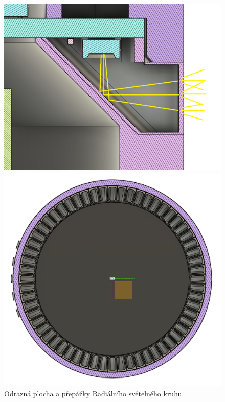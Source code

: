 \begin{figure}[h!]
    \begin{minipage}{0.5\textwidth}
        \centering
        \includegraphics[width=\textwidth]{text/PraktickaCast/img/AHS-odrazkaRozptylka.png}
    \end{minipage}
    \begin{minipage}{0.5\textwidth}
        \centering
        \includegraphics[width=\textwidth]{text/PraktickaCast/img/AHS-prepazky.png}
    \end{minipage}
    \label{fig:AHS-nacrt-radializatoru}
    \caption{Odrazná plocha a přepážky Radiálního světelného kruhu}
\end{figure}

